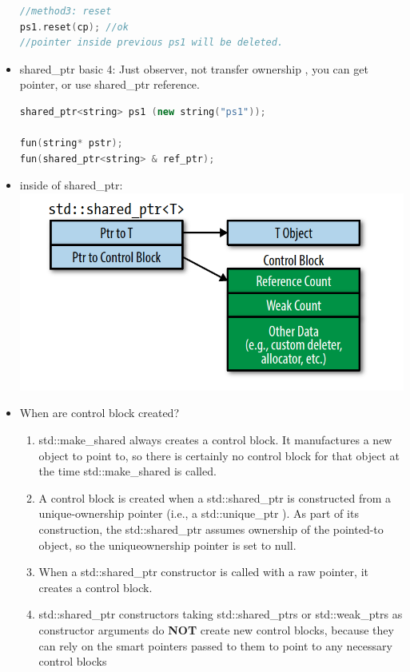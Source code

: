 \documentclass[a4paper,12pt,twoside]{book}
\begin{document}
\begin{itemize}
\begin{lstlisting}[frame=single, language=c++, mathescape=true]
//method3: reset
ps1.reset(cp); //ok
//pointer inside previous ps1 will be deleted.
\end{lstlisting}

\item shared\_ptr basic 4: Just observer, not transfer ownership , you can get pointer, or use shared\_ptr reference.
\begin{lstlisting}[frame=single, language=c++]
shared_ptr<string> ps1 (new string("ps1"));

fun(string* pstr);
fun(shared_ptr<string> & ref_ptr);
\end{lstlisting}

\item inside of shared\_ptr: \newline
\includegraphics[scale=0.8]{pics/shared.png}


\item When are control block created?
\begin{enumerate}
\item std::make\_shared  always creates a control block. It manufactures
a new object to point to, so there is certainly no control block for that
object at the time std::make\_shared is called.
\item A control block is created when a std::shared\_ptr is constructed from a
unique-ownership pointer (i.e., a std::unique\_ptr ). As part of its construction, the
std::shared\_ptr assumes ownership of the pointed-to object, so the uniqueownership
pointer is set to null.
\item When a std::shared\_ptr constructor is called with a raw pointer, it creates a
control block.
\item std::shared\_ptr constructors taking std::shared\_ptrs or std::weak\_ptrs
as constructor arguments do \textbf{NOT} create new control blocks, because they can rely
on the smart pointers passed to them to point to any necessary control blocks
\end{enumerate}



\end{itemize}
\end{document}
